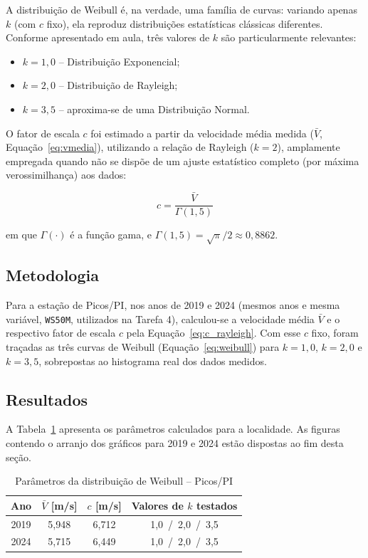 \documentclass[11pt,a4paper]{article}
\begin{document}
A distribuição de Weibull é, na verdade, uma família de curvas: variando
apenas $k$ (com $c$ fixo), ela reproduz distribuições estatísticas
clássicas diferentes. Conforme apresentado em aula, três valores de $k$ são
particularmente relevantes:

\begin{itemize}
    \item $k = 1{,}0$ -- Distribuição Exponencial;
    \item $k = 2{,}0$ -- Distribuição de Rayleigh;
    \item $k = 3{,}5$ -- aproxima-se de uma Distribuição Normal.
\end{itemize}

O fator de escala $c$ foi estimado a partir da velocidade média medida
($\bar{V}$, Equação~\eqref{eq:vmedia}), utilizando a relação de Rayleigh
($k=2$), amplamente empregada quando não se dispõe de um ajuste estatístico
completo (por máxima verossimilhança) aos dados:

\begin{equation}
    c = \frac{\bar{V}}{\Gamma(1{,}5)}
    \label{eq:c_rayleigh}
\end{equation}

em que $\Gamma(\cdot)$ é a função gama, e $\Gamma(1{,}5) = \sqrt{\pi}/2
\approx 0{,}8862$.

\subsection{Metodologia}

Para a estação de Picos/PI, nos anos de 2019 e 2024 (mesmos anos e mesma
variável, \texttt{WS50M}, utilizados na Tarefa 4), calculou-se a velocidade
média $\bar{V}$ e o respectivo fator de escala $c$ pela
Equação~\eqref{eq:c_rayleigh}. Com esse $c$ fixo, foram traçadas as três
curvas de Weibull (Equação~\eqref{eq:weibull}) para $k=1{,}0$, $k=2{,}0$ e
$k=3{,}5$, sobrepostas ao histograma real dos dados medidos.

\subsection{Resultados}

A Tabela~\ref{tab:weibull_picos} apresenta os parâmetros calculados para a localidade. As figuras contendo o arranjo dos gráficos para 2019 e 2024 estão dispostas ao fim desta seção.

\begin{table}[H]
\centering
\caption{Parâmetros da distribuição de Weibull -- Picos/PI}
\label{tab:weibull_picos}
\begin{tabular}{cccc}
\toprule
\textbf{Ano} & $\bar{V}$ \textbf{[m/s]} & $c$ \textbf{[m/s]} & \textbf{Valores de $k$ testados}\\
\midrule
2019 & 5,948 & 6,712 & 1,0\ /\ 2,0\ /\ 3,5\\
2024 & 5,715 & 6,449 & 1,0\ /\ 2,0\ /\ 3,5\\
\bottomrule
\end{tabular}
\end{table}
\end{document}

